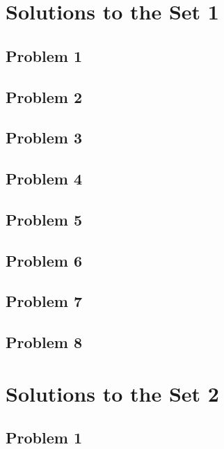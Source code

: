 \documentclass[12pt]{article}
\begin{document}
\newpage
\section*{Solutions to the Set 1}
\subsection*{Problem 1}
\subsection*{Problem 2}
\subsection*{Problem 3}
\subsection*{Problem 4}
\subsection*{Problem 5}
\subsection*{Problem 6}
\subsection*{Problem 7}
\subsection*{Problem 8}
\section*{Solutions to the Set 2}
\subsection*{Problem 1}
\end{document}
